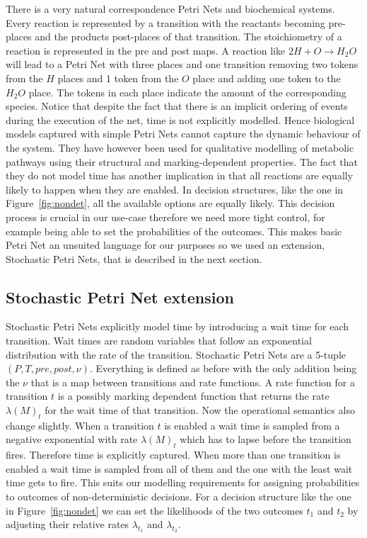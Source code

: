 There is a very natural correspondence Petri Nets and biochemical
systems. Every reaction is represented by a transition with the
reactants becoming pre-places and the products post-places of that
transition. The stoichiometry of a reaction is represented in the
pre and post maps. A reaction like $2H + O \rightarrow H_2O$ will lead
to a Petri Net with three places and one transition removing two
tokens from the $H$ places and 1 token from the $O$ place and adding
one token to the $H_2O$ place. The tokens in each place indicate the
amount of the corresponding species. Notice that despite the
fact that there is an implicit ordering of events during the execution
of the net, time is not explicitly modelled. Hence biological models
captured with simple Petri Nets cannot capture the dynamic behaviour
of the system. They have however been used for qualitative modelling
of metabolic pathways using their structural and
marking-dependent properties. The fact that they do not model time has
another implication in that all reactions are equally likely to
happen when they are enabled. In decision structures, like the one in
Figure~\ref{fig:nondet}, all the available options are equally
likely. This decision process is crucial in our use-case therefore we
need more tight control, for example being able to set the
probabilities of the outcomes. This makes basic Petri Net an unsuited
language for our purposes so we used an extension, Stochastic Petri
Nets, that is described in the next section.

\subsection{Stochastic Petri Net extension}
\label{sec:spn}
Stochastic Petri Nets explicitly model time by introducing a wait time
for each transition. Wait times are random variables that follow an
exponential distribution with the rate of the transition. Stochastic
Petri Nets are a 5-tuple $(P, T, pre, post, \nu)$. Everything is
defined as before with the only addition being the $\nu$ that is a
map between transitions and rate functions. A rate function for a
transition $t$ is a
possibly marking dependent function that returns the rate
$\lambda(M)_t$ for the wait time of that transition. Now the
operational semantics also change slightly. When a transition $t$ is
enabled a wait time is sampled from a negative exponential with rate
$\lambda(M)_t$ which has to lapse before the transition
fires. Therefore time is explicitly captured. When more than one
transition is enabled a wait time is sampled from all of them and the
one with the least wait time gets to fire. This suits our modelling
requirements for assigning probabilities to outcomes of
non-deterministic decisions. For a decision structure like the one in
Figure~\ref{fig:nondet} we can set the likelihoods of the two outcomes
$t_1$ and $t_2$ by adjusting their relative rates $\lambda_{t_1}$ and
$\lambda_{t_2}$. 

